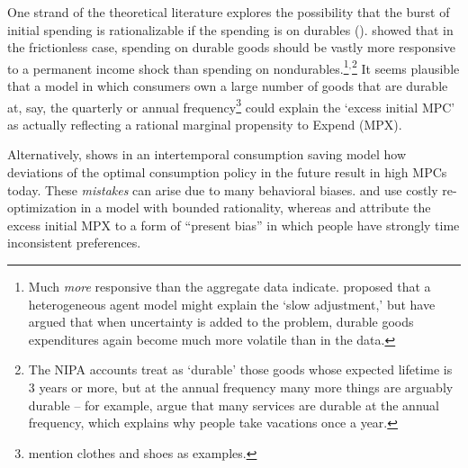 \documentclass[\econtexRoot/HAFiscal]{subfiles}
\begin{document}
One strand of the theoretical literature explores the possibility that the burst of initial spending is rationalizable if the spending is on durables  (\cite{bcShocksStocks}).  \cite{mankiw:durgoods} showed that in the frictionless case, spending on durable goods should be vastly more responsive to a permanent income shock than spending on nondurables.\footnote{Much \textit{more} responsive than the aggregate data indicate.  \cite{caballeroDurable} proposed that a heterogeneous agent model might explain the `slow adjustment,' but \cite{cdSs} have argued that when uncertainty is added to the problem, durable goods expenditures again become much more volatile than in the data.}$^{,}$\footnote{The NIPA accounts treat as `durable' those goods whose expected lifetime is 3 years or more, but at the annual frequency many more things are arguably durable -- for example, \cite{hkpMemorable} argue that many services are durable at the annual frequency, which explains why people take vacations once a year.}  It seems plausible that a model in which consumers own a large number of goods that are durable at, say, the quarterly or annual frequency\footnote{\cite{bdTimeSeriesC} mention clothes and shoes as examples.} could explain the `excess initial MPC' as actually reflecting a rational marginal propensity to Expend (MPX).  




\hypertarget{indarte2024explains}{}

Alternatively, \cite{Lian2023-ca} shows in an intertemporal consumption saving model how deviations of the optimal consumption policy in the future result in high MPCs today. These \textit{mistakes} can arise due to many behavioral biases. \cite{BoutrosWindfall} and \cite{ilutEconomic} use costly re-optimization in a model with bounded rationality, whereas \cite{indarte2024explains} and \cite{lmmPresentBias} attribute the excess initial MPX to a form of ``present bias'' in which people have strongly time inconsistent preferences.
\end{document}
